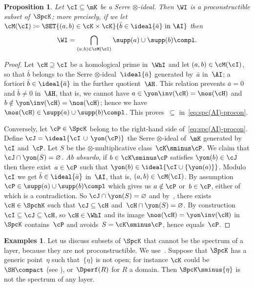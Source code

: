 \documentclass[11pt]{amsart}
\numberwithin{equation}{section} %
\theoremstyle{plain}
\newtheorem{prop}[equation]{Proposition}
\theoremstyle{definition}
\newtheorem{exas}[equation]{Examples}
\theoremstyle{remark}
\begin{document}
%
\begin{prop}
\label{prop:spc(AI)-procon}%
Let $\cI\subseteq \mK$ be a Serre $\otimes$-ideal. Then $\WI$ is a proconstructible subset of~$\SpcK$; more precisely, if we let  $\cM(\cI)\coloneq\SET{(a,b)\in\cK\times\cK}{\bar{b}\in\ideal{\bar{a}}\textrm{ in }\AI}$ then
%
\begin{equation}
\label{eq:spc(AI)-procon}%
\WI=\bigcap_{(a,b)\in \cM(\cI)}\supp(a)\cup \supp(b)\compl.
\end{equation}
%
\end{prop}
%
\begin{proof}
Let $\cH\supseteq\cI$ be a homological prime in~$\WhI$ and let $(a,b)\in \cM(\cI)$, so that $\bar{b}$ belongs to the Serre $\otimes$-ideal~$\ideal{\bar{a}}$ generated by~$\bar{a}$ in~$\AI$; a fortiori $\bar{b}\in\ideal{\bar{a}}$ in the further quotient~$\AH$. This relation prevents $\bar{a}=0$ and $\bar{b}\neq0$ in~$\AH$, that is, we cannot have $a\in\yon\inv(\cH)=\nos(\cH)$ and $b\notin\yon\inv(\cH)=\nos(\cH)$; hence we have $\nos(\cH)\in \supp(a)\cup \supp(b)\compl$.
This proves~$\subseteq$ in~\eqref{eq:spc(AI)-procon}.

Conversely, let $\cP\in\SpcK$ belong to the right-hand side of~\eqref{eq:spc(AI)-procon}.
Define $\cJ=\ideal{\cI\,\cup\,\yon(\cP)}$ the Serre $\otimes$-ideal of~$\mK$ generated by~$\cI$ and~$\cP$. Let $S$ be the $\otimes$-multiplicative class~$\cK\sminus\cP$.
We claim that $\cJ\cap \yon(S)=\varnothing$. \textsl{Ab absurdo}, if $b\in\cK\sminus \cP$ satisfies $\yon(b)\in\cJ$ then there exist~$a\in\cP$ such that $\yon(b)\in \ideal{\cI\cup\{\yon(a)\}}$. Modulo~$\cI$ we get $\bar{b}\in \ideal{\bar{a}}$ in~$\AI$, that is, $(a,b)\in \cM(\cI)$. By assumption $\cP\in \supp(a)\cup \supp(b)\compl$ which gives us $a\notin\cP$ or~$b\in \cP$, either of which is a contradiction. So $\cJ\cap \yon(S)=\varnothing$ and by~\cite[Lemma~3.8]{Balmer20a}, there exists~$\cH\in\SpchK$ such that $\cJ\subseteq \cH$ and~$\cH\cap \yon(S)=\varnothing$. By construction $\cI\subseteq \cJ\subseteq \cH$, so $\cH\in \WhI$ and its image $\nos(\cH)=\yon\inv(\cH)$ in~$\SpcK$ contains~$\cP$ and avoids~$S=\cK\sminus\cP$, hence equals~$\cP$.
\end{proof}

%
\begin{exas}
Let us discuss subsets of $\SpcK$ that cannot be the spectrum of a layer, because they are not proconstructible. We use~.
Suppose that $\SpcK$ has a generic point~$\eta$ such that~$\{\eta\}$ is not open; for instance $\cK$ could be~$\SH\compact$ (see \cite[Corollary 9.5(c)]{Balmer10b}), or~$\Dperf(R)$ for $R$ a domain. Then $\SpcK \sminus \{\eta\}$ is not the spectrum of any layer.
\end{exas}
\end{document}
